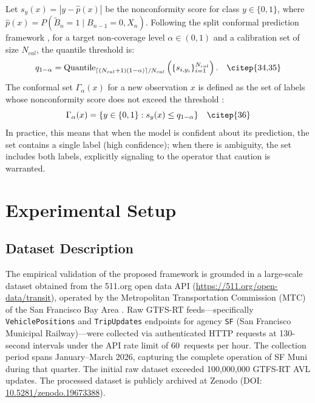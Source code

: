 \documentclass[fleqn,10pt,lineno]{wlpeerj}
\begin{document}
Let $s_y(x) = |y - \hat{p}(x)|$ be the nonconformity score for class $y \in \{0, 1\}$, where
$\hat{p}(x)=P(\tilde{B}_n=1\mid B_{n-1}=0, X_n)$. Following the split conformal prediction
framework \citep{34,35}, for a target non-coverage level $\alpha\in(0,1)$
and a calibration set of size $N_{cal}$, the quantile threshold is:
\begin{equation}
  q_{1-\alpha}=\mathrm{Quantile}_{\lceil (N_{cal}+1)(1-\alpha)\rceil /N_{cal}}\left(\{s_{i, y_i}\}_{i=1}^{N_{cal}}\right). \quad \text{\citep{34,35}}
\end{equation}
The conformal set $\Gamma_{\alpha}(x)$ for a new observation $x$ is defined as the set of labels whose nonconformity score does not exceed the threshold \citep{36}:
\begin{equation}
  \Gamma_{\alpha}(x)=\{y \in \{0, 1\} : s_y(x) \le q_{1-\alpha}\} \quad \text{\citep{36}}
\end{equation}
In practice, this means that when the model is confident about its prediction, the set contains
a single label (high confidence); when there is ambiguity, the set includes both labels,
explicitly signaling to the operator that caution is warranted.

\section{Experimental Setup}
\label{sec:experiments}

\subsection{Dataset Description}

The empirical validation of the proposed framework is grounded in a large-scale dataset obtained
from the 511.org open data API (\url{https://511.org/open-data/transit}), operated by the
Metropolitan Transportation Commission (MTC) of the San Francisco Bay Area \citep{28}. Raw
GTFS-RT feeds---specifically \texttt{VehiclePositions} and \texttt{TripUpdates} endpoints for
agency \texttt{SF} (San Francisco Municipal Railway)---were collected via authenticated HTTP
requests at 130-second intervals under the API rate limit of 60~requests per hour. The
collection period spans January--March 2026, capturing the complete operation of SF Muni during
that quarter. The initial raw dataset exceeded 100,000,000 GTFS-RT AVL updates. The processed
dataset is publicly archived at Zenodo \citep{39}
(DOI: \href{https://doi.org/10.5281/zenodo.19673388}{10.5281/zenodo.19673388}).
\end{document}
